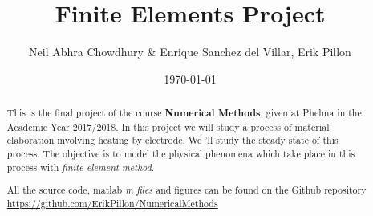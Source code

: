 \documentclass{article}
\begin{document}
\date{\today}
\author{Neil Abhra Chowdhury \& Enrique Sanchez del Villar, Erik Pillon}
\title{Finite Elements Project}
\maketitle
\begin{abstract}
	This is the final project of the course \textbf{Numerical Methods}, given at Phelma in the Academic Year 2017/2018. In this project we will study a process of material elaboration involving heating by electrode. We 'll study the steady state of this process. The objective is to model the physical phenomena which take place in this process with \emph{finite element method}.
	
	All the source code, matlab \textit{m files} and figures can be found on the Github repository \url{https://github.com/ErikPillon/NumericalMethods}
\end{abstract}





\end{document}
